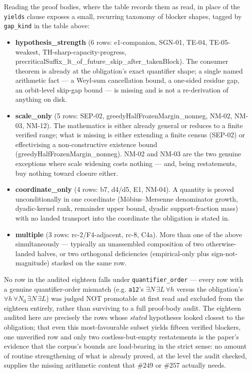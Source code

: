 Reading the proof bodies, where the table records them as read, in place of the \texttt{yields}
clause exposes a small, recurring taxonomy of blocker shapes, tagged by
\texttt{gap\_kind} in the table above:

\begin{itemize}[nosep]
\item \textbf{hypothesis\_strength} (6 rows: e1-companion, SGN-01, TE-04,
TE-05-weakest, TH-sharp-capacity-progress,
precriticalSuffix\_lt\_of\_future\_skip\_after\_takenBlock). The consumer
theorem is already at the obligation's exact quantifier shape; a single
named arithmetic fact — a Weyl-sum cancellation bound, a one-sided residue
gap, an orbit-level skip-gap bound — is missing and is not a re-derivation
of anything on disk.
\item \textbf{scale\_only} (5 rows: SEP-02, greedyHalfFrozenMargin\_nonneg,
NM-02, NM-03, NM-12). The mathematics is either already general or reduces
to a finite verified range; what is missing is either extending a finite
census (SEP-02) or effectivising a non-constructive existence bound
(greedyHalfFrozenMargin\_nonneg). NM-02 and NM-03 are the two genuine
exceptions where scale widening costs nothing — and, being restatements, buy
nothing toward closure either.
\item \textbf{coordinate\_only} (4 rows: b7, d4/d5, E1, NM-04). A quantity
is proved unconditionally in one coordinate (Möbius--Mersenne denominator
growth, dyadic-kernel rank, remainder upper bound, dyadic support-fraction
mass) with no landed transport into the coordinate the obligation is stated
in.
\item \textbf{multiple} (3 rows: rc-2/F4-adjacent, rc-8, C4a). More than
one of the above simultaneously — typically an unassembled composition of
two otherwise-landed halves, or two orthogonal deficiencies (empirical-only
plus sign-not-magnitude) stacked on the same row.
\end{itemize}

No row in the audited eighteen falls under \texttt{quantifier\_order} — every
row with a genuine quantifier-order mismatch (e.g. \texttt{a12}'s
\(\exists N\,\exists L\,\forall h\) versus the obligation's
\(\forall h\,\forall N_0\,\exists N\,\exists L\)) was judged NOT promotable
at first read and excluded from the eighteen entirely, rather than surviving
to a full proof-body audit. The eighteen audited here are precisely the rows
whose \emph{stated} hypotheses looked closest to the obligation; that even
this most-favourable subset yields fifteen verified blockers, one unverified row and only two
costless-but-empty restatements is the paper's evidence that the corpus's
bounds are load-bearing in the strict sense: no amount of routine
strengthening of what is already proved, at the level the audit checked,
supplies the missing arithmetic content that \(\#249\) or \(\#257\)
actually needs.

